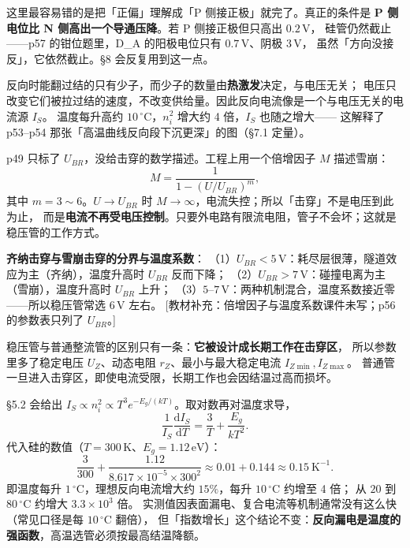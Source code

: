 \documentclass[11pt]{ctexart}
\begin{document}
这里最容易错的是把「正偏」理解成「P 侧接正极」就完了。真正的条件是
\textbf{P 侧电位比 N 侧高出一个导通压降}。若 P 侧接正极但只高出 $0.2\,\mathrm{V}$，
硅管仍然截止——p57 的钳位题里，D\_A 的阳极电位只有 $0.7\,\mathrm{V}$、阴极 $3\,\mathrm{V}$，
虽然「方向没接反」，它依然截止。§8 会反复用到这一点。


反向时能翻过结的只有少子，而少子的数量由\textbf{热激发}决定，与电压无关；
电压只改变它们被拉过结的速度，不改变供给量。因此反向电流像是一个与电压无关的电流源 $I_S$。
温度每升高约 $10\,{}^\circ\mathrm{C}$，$n_i^2$ 增大约 4 倍，$I_S$ 也随之增大——
这解释了 p53--p54 那张「高温曲线反向段下沉更深」的图（§7.1 定量）。


p49 只标了 $U_{BR}$，没给击穿的数学描述。工程上用一个倍增因子 $M$ 描述雪崩：
\[
M=\frac{1}{1-\left(U/U_{BR}\right)^{m}},
\]
其中 $m=3\sim6$。$U\to U_{BR}$ 时 $M\to\infty$，电流失控；所以「击穿」不是电压到此为止，
而是\textbf{电流不再受电压控制}。只要外电路有限流电阻，管子不会坏；这就是稳压管的工作方式。

\textbf{齐纳击穿与雪崩击穿的分界与温度系数}：
（1）$U_{BR}<5\,\mathrm{V}$：耗尽层很薄，隧道效应为主（齐纳），温度升高时 $U_{BR}$ 反而下降；
（2）$U_{BR}>7\,\mathrm{V}$：碰撞电离为主（雪崩），温度升高时 $U_{BR}$ 上升；
（3）$5$--$7\,\mathrm{V}$：两种机制混合，温度系数接近零——所以稳压管常选 $6\,\mathrm{V}$ 左右。
[教材补充：倍增因子与温度系数课件未写；p56 的参数表只列了 $U_{BR}$。]

稳压管与普通整流管的区别只有一条：\textbf{它被设计成长期工作在击穿区}，
所以参数里多了稳定电压 $U_Z$、动态电阻 $r_Z$、最小与最大稳定电流 $I_{Z\min},I_{Z\max}$。
普通管一旦进入击穿区，即使电流受限，长期工作也会因结温过高而损坏。


§5.2 会给出 $I_S\propto n_i^2\propto T^3e^{-E_g/(kT)}$。取对数再对温度求导，
\[
\frac{1}{I_S}\frac{\mathrm{d}I_S}{\mathrm{d}T}
=\frac{3}{T}+\frac{E_g}{kT^2}.
\]
代入硅的数值（$T=300\,\mathrm{K}$、$E_g=1.12\,\mathrm{eV}$）：
\[
\frac{3}{300}+\frac{1.12}{8.617\times10^{-5}\times300^2}
\approx0.01+0.144\approx0.15\ \mathrm{K^{-1}}.
\]
即温度每升 $1\,{}^\circ\mathrm{C}$，理想反向电流增大约 $15\%$，每升 $10\,{}^\circ\mathrm{C}$ 约增至 4 倍；
从 $20$ 到 $80\,{}^\circ\mathrm{C}$ 约增大 $3.3\times10^3$ 倍。
实测值因表面漏电、复合电流等机制通常没有这么快（常见口径是每 $10\,{}^\circ\mathrm{C}$ 翻倍），
但「指数增长」这个结论不变：\textbf{反向漏电是温度的强函数}，高温选管必须按最高结温降额。
\end{document}
